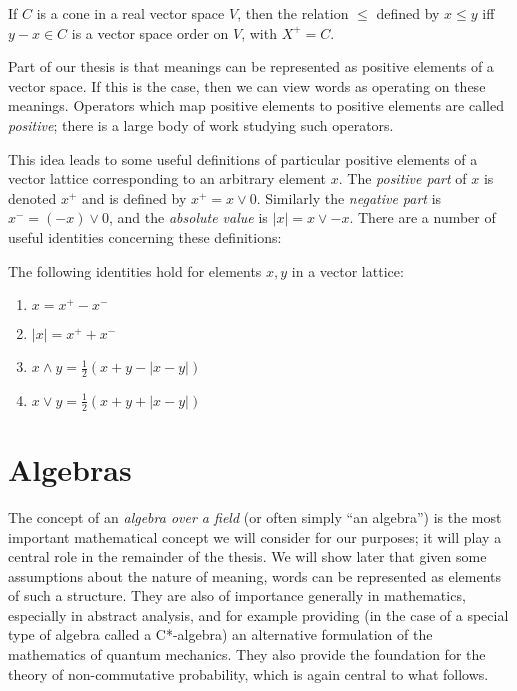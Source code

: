 \documentclass[12pt]{report}
\begin{document}
\begin{prop}
If $C$ is a cone in a real vector space $V$, then the relation $\le$ defined by $x \le y$ iff $y - x \in C$ is a vector space order on $V$, with $X^+ = C$.
\end{prop}

Part of our thesis is that meanings can be represented as positive elements of a vector space. If this is the case, then we can view words as operating on these meanings. Operators which map positive elements to positive elements are called \emph{positive}; there is a large body of work studying such operators.

This idea leads to some useful definitions of particular positive elements of a vector lattice corresponding to an arbitrary element $x$. The \emph{positive part} of $x$ is denoted $x^+$ and is defined by $x^+ = x \lor 0$. Similarly the \emph{negative part} is $x^- = (-x)\lor 0$, and the \emph{absolute value} is $|x| = x \lor -x$. There are a number of useful identities concerning these definitions:
\begin{prop}
The following identities hold for elements $x,y$ in a vector lattice:
\begin{enumerate}[\indent(a).]
\item $x = x^+ - x^-$
\item $|x| = x^+ + x^-$
\item $x\land y = \frac{1}{2}(x + y - |x - y|)$
\item $x\lor y =  \frac{1}{2}(x + y + |x - y|)$
\end{enumerate}
\end{prop}

\section{Algebras}

The concept of an \emph{algebra over a field} (or often simply ``an algebra'') is the most important mathematical concept we will consider for our purposes; it will play a central role in the remainder of the thesis. We will show later that given some assumptions about the nature of meaning, words can be represented as elements of such a structure. They are also of importance generally in mathematics, especially in abstract analysis, and for example providing (in the case of a special type of algebra called a C*-algebra) an alternative formulation of the mathematics of quantum mechanics. They also provide the foundation for the theory of non-commutative probability, which is again central to what follows.
\end{document}
